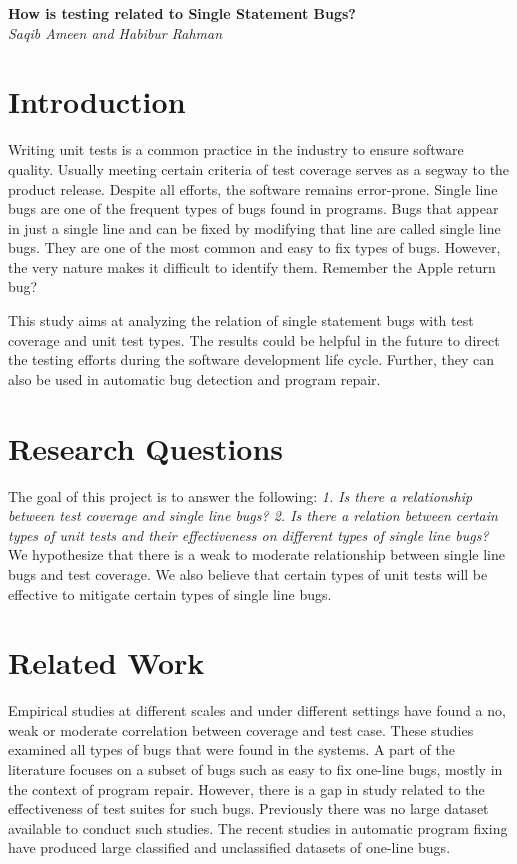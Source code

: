 \documentclass[11pt]{article}
\begin{document}
\begin{center}
{\bf \Large How is testing related to Single Statement Bugs?}\\
\vspace{.1in}
{\em Saqib Ameen and Habibur Rahman}
\end{center}


\section{Introduction}

Writing unit tests is a common practice in the industry to ensure software quality. Usually meeting certain criteria of test coverage serves as a segway to the product release. Despite all efforts, the software remains error-prone. Single line bugs are one of the frequent types of bugs found in programs. Bugs that appear in just a single line and can be fixed by modifying that line are called single line bugs. They are one of the most common and easy to fix types of bugs. However, the very nature makes it difficult to identify them. Remember the Apple return bug?

This study aims at analyzing the relation of single statement bugs with test coverage and unit test types. The results could be helpful in the future to direct the testing efforts during the software development life cycle. Further, they can also be used in automatic bug detection and program repair.

\section{Research Questions}

The goal of this project is to answer the following: \textit{1. Is there a relationship between test coverage and single line bugs? 2. Is there a relation between certain types of unit tests and their effectiveness on different types of single line bugs?} We hypothesize that there is a weak to moderate relationship between single line bugs and test coverage. We also believe that certain types of unit tests will be effective to mitigate certain types of single line bugs.

\section{Related Work}

Empirical studies \cite{gren2017relation, antinyan2018mythical, inozemtseva2014coverage} at different scales and under different settings have found a no, weak or moderate correlation between coverage and test case. These studies examined all types of bugs that were found in the systems. A part of the literature focuses on a subset of bugs such as easy to fix one-line bugs, mostly in the context of program repair. However, there is a gap in study related to the effectiveness of test suites for such bugs. Previously there was no large dataset available to conduct such studies. The recent studies in automatic program fixing have produced large classified \cite{karampatsis2020often} and unclassified \cite{chen2019sequencer} datasets of one-line bugs.
\end{document}
